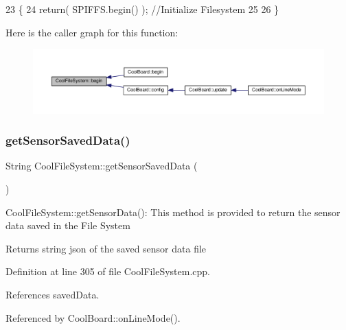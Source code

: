 \begin{DoxyCode}
23 \{
24     \textcolor{keywordflow}{return}( SPIFFS.begin() );                                   \textcolor{comment}{//Initialize Filesystem}
25 
26 \}
\end{DoxyCode}
Here is the caller graph for this function\+:\nopagebreak
\begin{figure}[H]
\begin{center}
\leavevmode
\includegraphics[width=350pt]{classCoolFileSystem_a6ba6f666ed4c530174f8569d2c636748_icgraph}
\end{center}
\end{figure}
\mbox{\label{classCoolFileSystem_a5c58bca3735c0ed3efb268d70ef998ef}} 
\subsubsection{\texorpdfstring{get\+Sensor\+Saved\+Data()}{getSensorSavedData()}}
{\footnotesize\ttfamily String Cool\+File\+System\+::get\+Sensor\+Saved\+Data (\begin{DoxyParamCaption}{ }\end{DoxyParamCaption})}

Cool\+File\+System\+::get\+Sensor\+Data()\+: This method is provided to return the sensor data saved in the File System

\begin{DoxyReturn}{Returns}
string json of the saved sensor data file 
\end{DoxyReturn}


Definition at line 305 of file Cool\+File\+System.\+cpp.



References saved\+Data.



Referenced by Cool\+Board\+::on\+Line\+Mode().


